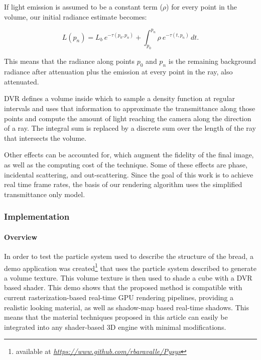 \documentclass[oneside,a4paper,spanish,links]{amca}
\begin{document}
If light emission is assumed to be a constant term ($\rho$) for
every point in the volume, our initial radiance estimate becomes:

\begin{equation} \label{eq:ray_radiance}  
  L(p_n) = L_b \ e^{-\tau(p_0, p_n)} + \int_{p_0}^{p_n} \rho \ e^{-\tau(t,p_n)} \, dt.
\end{equation}

This means that the radiance along points $p_0$ and
$p_n$ is the remaining background radiance after attenuation plus the
emission at every point in the ray, also attenuated.

DVR defines a volume inside which to sample a density function at
regular intervals and uses that information to approximate the
transmittance along those points and compute the amount of light
reaching the camera along the direction of a ray. The integral sum is
replaced by a discrete sum over the length of the ray that intersects
the volume.

Other effects can be accounted for, which augment the fidelity of the
final image, as well as the computing cost of the technique. Some of
these effects are phase, incidental scattering, and
out-scattering. Since the goal of this work is to achieve real time
frame rates, the basis of our rendering algorithm uses the simplified
transmittance only model.

\subsubsection{Implementation}

\paragraph{Overview}

In order to test the particle system used to describe the structure of
the bread, a demo application was created\footnote{available at
  \emph{\url{https://www.github.com/rbaravalle/Pysys}}} that uses the particle
system described to generate a volume texture. This volume texture is
then used to shade a cube with a DVR based shader. This demo shows
that the proposed method is compatible with current
rasterization-based real-time GPU rendering pipelines, providing a
realistic looking material, as well as shadow-map based real-time
shadows. This means that the material techniques proposed in this
article  can easily be integrated into any shader-based 3D engine with
minimal modifications.
\end{document}
